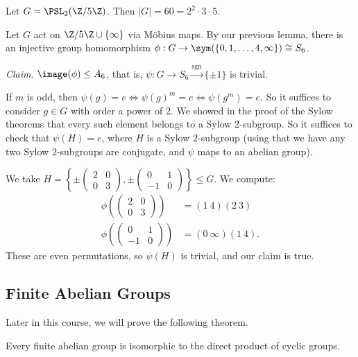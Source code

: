 \begin{example}
	Let $G = \PSL_2(\Z/5\Z)$. Then $|G| = 60 = 2^2 \cdot 3 \cdot 5$.

	Let $G$ act on $\Z/5\Z \cup \{\infty\}$ via Möbius maps. By our previous lemma, there is an injective group homomorphism $\phi : G \rightarrow \sym(\{0, 1, \dots, 4, \infty\}) \cong S_6$.

	\emph{Claim}. $\image(\phi) \leq A_6$, that is, $\psi: G \rightarrow S_6 \xrightarrow{\operatorname{sgn}} \{\pm 1\}$ is trivial.

	If $m$ is odd, then $\psi(g) = e \iff \psi(g)^m = e \iff \psi(g^m) = e$. So it suffices to consider $g \in G$ with order a power of 2. We showed in the proof of the Sylow theorems that every such element belongs to a Sylow 2-subgroup. So it suffices to check that $\psi(H) = e$, where $H$ is a Sylow $2$-subgroup (using that we have any two Sylow $2$-subgroups are conjugate, and $\psi$ maps to an abelian group). 

	We take $H =\left\{ \pm \begin{pmatrix}
		2 & 0 \\ 0 & 3
	\end{pmatrix},\pm \begin{pmatrix}
		0 & 1 \\ -1 & 0 
	\end{pmatrix} \right \} \leq G$. We compute:
	\begin{align*}
		\phi\left(\begin{pmatrix}
			2 & 0 \\ 0 & 3
		\end{pmatrix}\right) &= (1\ 4)(2\ 3)\\
		\phi\left(\begin{pmatrix}
		0 & 1 \\ -1 & 0
		\end{pmatrix}\right) &= (0\ \infty)(1\ 4).
	\end{align*} 
	These are even permutations, so $\psi(H)$ is trivial, and our claim is true.
\end{example}

\subsection{Finite Abelian Groups}

Later in this course, we will prove the following theorem.

\begin{theorem}
	Every finite abelian group is isomorphic to the direct product of cyclic groups.
\end{theorem}

